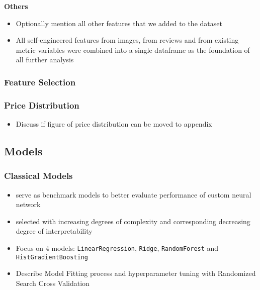 \documentclass[12pt, letterpaper]{article}
\begin{document}
\textbf{Others} %
\begin{itemize}
    \item Optionally mention all other features that we added to the dataset
    \item All self-engineered features from images, from reviews and from existing metric variables were combined into a single dataframe as the foundation of all further analysis
\end{itemize}


\subsubsection{Feature Selection} %


\subsubsection{Price Distribution} %

\begin{itemize}
    \item Discuss if figure of price distribution can be moved to appendix
\end{itemize}



\subsection{Models} %

\subsubsection{Classical Models} %
\begin{itemize}
    \item serve as benchmark models to better evaluate performance of custom neural network
    \item selected with increasing degrees of complexity and corresponding decreasing degree of interpretability
    \item Focus on $4$ models: \texttt{LinearRegression}, \texttt{Ridge}, \texttt{RandomForest} and \texttt{HistGradientBoosting}
    \item Describe Model Fitting process and hyperparameter tuning with Randomized Search Cross Validation
\end{itemize}
\end{document}
